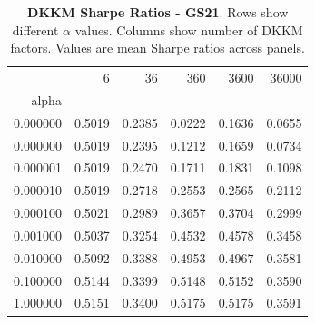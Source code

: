 \begin{table}[h]
\centering
\begin{tabular}{rrrrrr}
\toprule
 & 6 & 36 & 360 & 3600 & 36000 \\
alpha &  &  &  &  &  \\
\midrule
0.000000 & 0.5019 & 0.2385 & 0.0222 & 0.1636 & 0.0655 \\
0.000000 & 0.5019 & 0.2395 & 0.1212 & 0.1659 & 0.0734 \\
0.000001 & 0.5019 & 0.2470 & 0.1711 & 0.1831 & 0.1098 \\
0.000010 & 0.5019 & 0.2718 & 0.2553 & 0.2565 & 0.2112 \\
0.000100 & 0.5021 & 0.2989 & 0.3657 & 0.3704 & 0.2999 \\
0.001000 & 0.5037 & 0.3254 & 0.4532 & 0.4578 & 0.3458 \\
0.010000 & 0.5092 & 0.3388 & 0.4953 & 0.4967 & 0.3581 \\
0.100000 & 0.5144 & 0.3399 & 0.5148 & 0.5152 & 0.3590 \\
1.000000 & 0.5151 & 0.3400 & 0.5175 & 0.5175 & 0.3591 \\
\bottomrule
\end{tabular}
\caption{\textbf{DKKM Sharpe Ratios - GS21}.
    Rows show different $\alpha$ values. Columns show number of DKKM factors.
    Values are mean Sharpe ratios across panels.}
\label{tab:dkkm_sharpe_gs21}

\end{table}